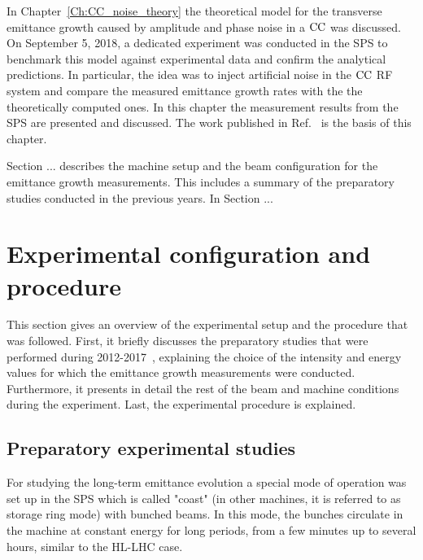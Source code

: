 \vspace*{-1mm}
In Chapter~\ref{Ch:CC_noise_theory} the theoretical model for the transverse emittance growth caused by amplitude and phase noise in a ${\mathrm{CC}}$ was discussed. On September 5, 2018, a dedicated experiment was conducted in the SPS to benchmark this model against experimental data and confirm the analytical predictions. In particular, the idea was to inject artificial noise in the ${\mathrm{CC}}$ RF system and compare the measured emittance growth rates with the the theoretically computed ones. In this chapter the measurement results from the SPS are presented and discussed. The work published in Ref.~\cite{Triantafyllou:2021khx} is the basis of this chapter.


Section ... describes the machine setup and the beam configuration for the emittance growth measurements. This includes a summary of the preparatory studies conducted in the previous years. In Section ...


\section{Experimental configuration and procedure}\label{sec:exp_setup_2018}
This section gives an overview of the experimental setup and the procedure that was followed. First, it briefly discusses the preparatory studies that were performed during 2012-2017~\cite{Calaga:1451286, Alekou_CC_coast_prep_2016, Antoniou:2649815}, explaining the choice of the intensity and energy values for which the emittance growth measurements were conducted. Furthermore, it presents in detail the rest of the beam and machine conditions during the experiment. Last, the experimental procedure is explained.

\subsection{Preparatory experimental studies}\label{sec:preparatory_studies_for_2018_MD}
For studying the long-term emittance evolution a special mode of operation was set up in the SPS which is called "coast" (in other machines, it is referred to as storage ring mode) with bunched beams. In this mode, the bunches circulate in the machine at constant energy for long periods, from a few minutes up to several hours, similar to the HL-LHC case.\setlength{\parskip}{2ex} %

